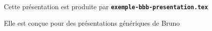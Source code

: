   \item Cette présentation est produite par \texttt{\textbf{exemple-bbb-presentation.tex}}
  \item Elle est conçue pour des présentations génériques de Bruno
